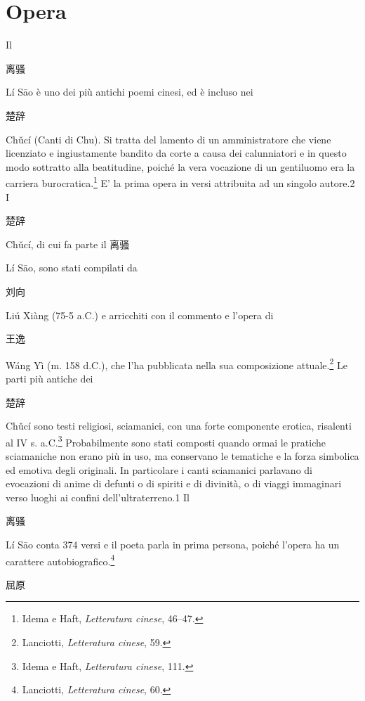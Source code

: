 \documentclass[12pt,titlepage]{article}
\begin{document}
\section{Opera}
Il 
\begin{CJK*}{UTF8}{gbsn}离骚\end{CJK*}
 Lí Sāo è uno dei più antichi poemi cinesi, ed è incluso nei 
 \begin{CJK*}{UTF8}{gbsn}楚辞 \end{CJK*}
 Chǔcí (Canti di Chu). Si tratta del lamento di un amministratore che viene licenziato e ingiustamente bandito da corte a causa dei calunniatori e in questo modo sottratto alla beatitudine, poiché la vera vocazione di un gentiluomo era la carriera burocratica.\footnote{Idema e Haft, \emph{Letteratura cinese}, 46–47.} E' la prima opera in versi attribuita ad un singolo autore.2
I 
\begin{CJK*}{UTF8}{gbsn}楚辞\end{CJK*}
 \begin{CJK*}{UTF8}{gbsn}Chǔcí, di cui fa parte il 
 离骚\end{CJK*}
  Lí Sāo, sono stati compilati da 
 \begin{CJK*}{UTF8}{gbsn} 刘向\end{CJK*}
   Liú Xiàng (75-5 a.C.) e arricchiti con il commento e l'opera di 
  \begin{CJK*}{UTF8}{gbsn} 王逸 \end{CJK*}
   Wáng Yì (m. 158 d.C.), che l'ha pubblicata nella sua composizione attuale.\footnote{Lanciotti, \emph{Letteratura cinese}, 59.} Le parti più antiche dei 
  \begin{CJK*}{UTF8}{gbsn} 楚辞\end{CJK*}
    Chǔcí sono testi religiosi, sciamanici, con una forte componente erotica, risalenti al IV s. a.C.\footnote{Idema e Haft, \emph{Letteratura cinese}, 111.} Probabilmente sono stati composti quando ormai le pratiche sciamaniche non erano più in uso, ma conservano le tematiche e la forza simbolica ed emotiva degli originali. In particolare i canti sciamanici parlavano di evocazioni di anime di defunti o di spiriti e di divinità, o di viaggi immaginari verso luoghi ai confini dell'ultraterreno.1
Il 
\begin{CJK*}{UTF8}{gbsn}离骚\end{CJK*}
 Lí Sāo conta 374 versi e il poeta parla in prima persona, poiché l'opera ha un carattere autobiografico.\footnote{Lanciotti, \emph{Letteratura cinese}, 60.}
\begin{CJK*}{UTF8}{gbsn}屈原 \end{CJK*}
\end{document}
